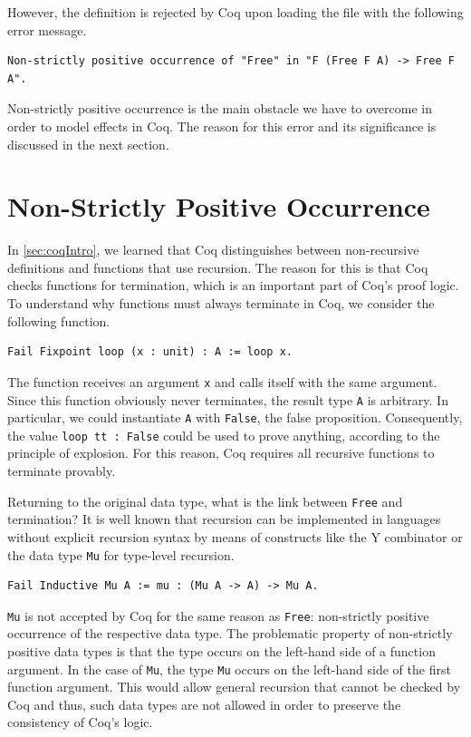 \documentclass[a4paper, 11pt, fleqn, twoside]{scrreprt}
\newcommand{\cinl}[1]{\texttt{#1}}
\begin{document}
However, the definition is rejected by Coq upon loading the file with the following error message.

\begin{verbatim}
Non-strictly positive occurrence of "Free" in "F (Free F A) -> Free F A".
\end{verbatim}

Non-strictly positive occurrence is the main obstacle we have to overcome in order to model effects in Coq.
The reason for this error and its significance is discussed in the next section.

\section{Non-Strictly Positive Occurrence}
\label{sec:non-strictly}

In \autoref{sec:coqIntro}, we learned that Coq distinguishes between non-recursive definitions and functions that use recursion.
The reason for this is that Coq checks functions for termination, which is an important part of Coq's proof logic.
To understand why functions must always terminate in Coq, we consider the following function.

\begin{verbatim}
Fail Fixpoint loop (x : unit) : A := loop x.
\end{verbatim}

The function receives an argument \cinl{x} and calls itself with the same argument.
Since this function obviously never terminates, the result type \cinl{A} is arbitrary.
In particular, we could instantiate \cinl{A} with \cinl{False}, the false proposition.
Consequently, the value \cinl{loop tt : False} could be used to prove anything, according to the principle of explosion.
For this reason, Coq requires all recursive functions to terminate provably.

Returning to the original data type, what is the link between \cinl{Free} and termination?
It is well known that recursion can be implemented in languages without explicit recursion syntax by means of constructs like the Y combinator or the data type \texttt{Mu} for type-level recursion.

\begin{verbatim}
Fail Inductive Mu A := mu : (Mu A -> A) -> Mu A.
\end{verbatim}

\cinl{Mu} is not accepted by Coq for the same reason as \cinl{Free}: non-strictly positive occurrence of the respective data type.
The problematic property of non-strictly positive data types is that the type occurs on the left-hand side of a function argument.
In the case of \cinl{Mu}, the type \cinl{Mu} occurs on the left-hand side of the first function argument.
This would allow general recursion that cannot be checked by Coq and thus, such data types are not allowed in order to preserve the consistency of Coq's logic.
\end{document}
